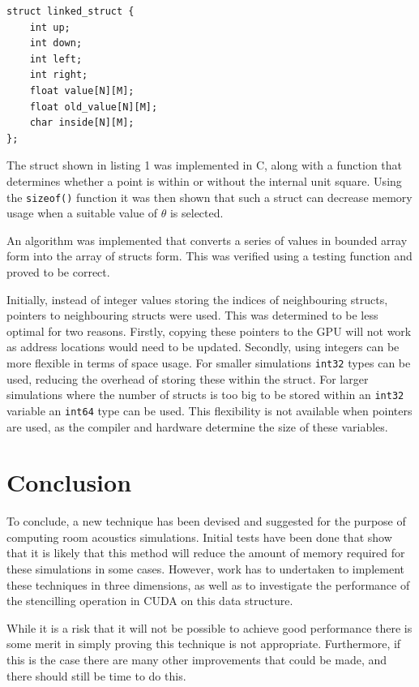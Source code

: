 \documentclass[a4paper,12pt]{article}
\begin{document}
\begin{lstlisting}[float,caption=First 2D example]
struct linked_struct {
    int up;
    int down;
    int left;
    int right;
    float value[N][M];
    float old_value[N][M];
    char inside[N][M];
};
\end{lstlisting}

The struct shown in listing 1 was implemented in C, along with a function that determines whether a point is within or without the internal unit square. Using the \verb|sizeof()| function it was then shown that such a struct can decrease memory usage when a suitable value of $\theta$ is selected.

An algorithm was implemented that converts a series of values in bounded array form into the array of structs form. This was verified using a testing function and proved to be correct.

Initially, instead of integer values storing the indices of neighbouring structs, pointers to neighbouring structs were used. This was determined to be less optimal for two reasons. Firstly, copying these pointers to the GPU will not work as address locations would need to be updated. Secondly, using integers can be more flexible in terms of space usage. For smaller simulations \verb|int32| types can be used, reducing the overhead of storing these within the struct. For larger simulations where the number of structs is too big to be stored within an \verb|int32| variable an \verb|int64| type can be used. This flexibility is not available when pointers are used, as the compiler and hardware determine the size of these variables.

\section{Conclusion}
To conclude, a new technique has been devised and suggested for the purpose of computing room acoustics simulations. Initial tests have been done that show that it is likely that this method will reduce the amount of memory required for these simulations in some cases. However, work has to undertaken to implement these techniques in three dimensions, as well as to investigate the performance of the stencilling operation in CUDA on this data structure.

While it is a risk that it will not be possible to achieve good performance there is some merit in simply proving this technique is not appropriate. Furthermore, if this is the case there are many other improvements that could be made, and there should still be time to do this.
\end{document}

